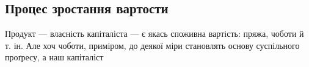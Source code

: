 \subsection[Процес зростання вартости]{Процес зростання вартости\footnotemarkZ{}}

Продукт — власність капіталіста — є якась споживна вартість:
пряжа, чоботи й т. ін. Але хоч чоботи, приміром, до деякої
міри становлять основу суспільного проґресу, а наш капіталіст
\parbreak{}  %
